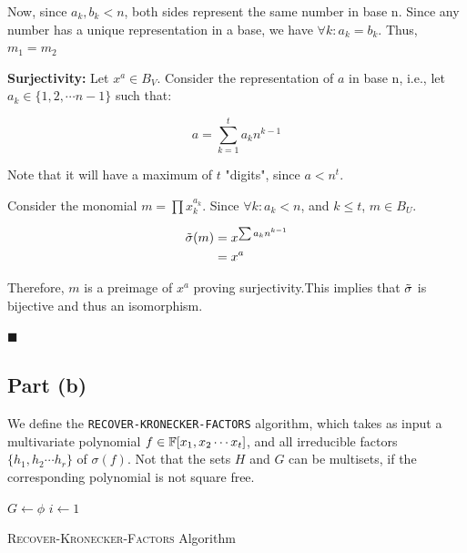 Now, since $a_k, b_k < n$, both sides represent the same number in base n. Since any number has a unique representation in a base, we have $\forall k: a_k = b_k$. Thus, $m_1 = m_2$

\textbf{Surjectivity: } Let $x^{a} \in B_V$. Consider the representation of $a$ in base n, i.e., let $a_k \in \{1, 2, \cdots n-1\}$ such that:

\[
a = \sum_{k=1}^t a_k n^{k-1}
\]

Note that it will have a maximum of $t$ "digits", since $a < n^t$. 

Consider the monomial $m = \prod x_k^{a_k}$. Since $\forall k: a_k < n$, and $k \le t$, $m \in B_U$.

\begin{align*}
    \Tilde{\sigma}(m) &= x^{\sum a_k n^{k - 1}} \\
    &= x^a
\end{align*}

Therefore, $m$ is a preimage of $x^a$ proving surjectivity.This implies that $\Tilde{\sigma}$ is bijective and thus an isomorphism.

\hfill$\blacksquare$

\subsection{Part (b)}

We define the \verb|RECOVER-KRONECKER-FACTORS| algorithm, which takes as input a multivariate polynomial $f \in \mathbb{F}[x_1, x_2 \cdots x_t]$, and all irreducible factors $\{h_1, h_2 \cdots h_r\}$ of $\sigma(f)$. Not that the sets $H$ and $G$ can be multisets, if the corresponding polynomial is not square free.

\begin{algorithm}[H]
    \SetAlgoLined
        $G \leftarrow \phi$
        $i \leftarrow 1$

        
        \;
    \caption{\textsc{Recover-Kronecker-Factors} Algorithm}
\end{algorithm}

